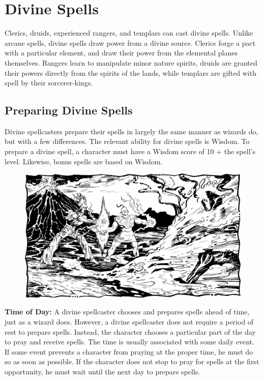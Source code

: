 \section{Divine Spells}
Clerics, druids, experienced rangers, and templars can cast divine spells. Unlike arcane spells, divine spells draw power from a divine source. Clerics forge a pact with a particular element, and draw their power from the elemental planes themselves. Rangers learn to manipulate minor nature spirits, druids are granted their powers directly from the spirits of the lands, while templars are gifted with spell by their sorcerer-kings.

\subsection{Preparing Divine Spells}
Divine spellcasters prepare their spells in largely the same manner as wizards do, but with a few differences. The relevant ability for divine spells is Wisdom. To prepare a divine spell, a character must have a Wisdom score of 10 + the spell's level. Likewise, bonus spells are based on Wisdom.

\begin{figure}[b!]
\centering
\includegraphics[width=\textwidth]{images/cleric-6.png}
\WOTC
\end{figure}

\textbf{Time of Day:} A divine spellcaster chooses and prepares spells ahead of time, just as a wizard does. However, a divine spellcaster does not require a period of rest to prepare spells. Instead, the character chooses a particular part of the day to pray and receive spells. The time is usually associated with some daily event. If some event prevents a character from praying at the proper time, he must do so as soon as possible. If the character does not stop to pray for spells at the first opportunity, he must wait until the next day to prepare spells.

